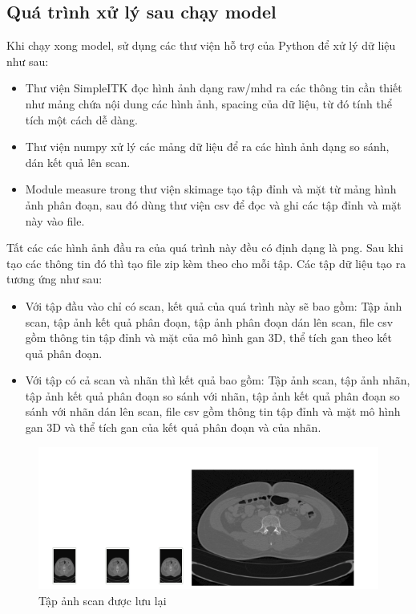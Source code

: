 \subsection{Quá trình xử lý sau chạy model}
Khi chạy xong model, sử dụng các thư viện hỗ trợ của Python để xử lý dữ liệu như sau:
\begin{itemize}
    \item Thư viện SimpleITK đọc hình ảnh dạng raw/mhd ra các thông tin cần thiết như mảng chứa nội dung các hình ảnh, spacing của dữ liệu, từ đó tính thể tích một cách dễ dàng.
    \item Thư viện numpy xử lý các mảng dữ liệu để ra các hình ảnh dạng so sánh, dán kết quả lên scan.
    \item Module measure trong thư viện skimage tạo tập đỉnh và mặt từ mảng hình ảnh phân đoạn, sau đó dùng thư viện csv để đọc và ghi các tập đỉnh và mặt này vào file.
\end{itemize}
Tất các các hình ảnh đầu ra của quá trình này đều có định dạng là png. Sau khi tạo các thông tin đó thì tạo file zip kèm theo cho mỗi tập. Các tập dữ liệu tạo ra tương ứng như sau:
\begin{itemize}
    \item Với tập đầu vào chỉ có scan, kết quả của quá trình này sẽ bao gồm: Tập ảnh scan, tập ảnh kết quả phân đoạn, tập ảnh phân đoạn dán lên scan, file csv gồm thông tin tập đỉnh và mặt của mô hình gan 3D, thể tích gan theo kết quả phân đoạn.
    \item Với tập có cả scan và nhãn thì kết quả bao gồm: Tập ảnh scan, tập ảnh nhãn, tập ảnh kết quả phân đoạn so sánh với nhãn,  tập ảnh kết quả phân đoạn so sánh với nhãn dán lên scan, file csv gồm thông tin tập đỉnh và mặt mô hình gan 3D và thể tích gan của kết quả phân đoạn và của nhãn.
\end{itemize}


\begin{figure}[h]
\centering
    \includegraphics[totalheight=7cm]{Images/app_listscan.png}
    \caption{Tập ảnh scan được lưu lại}
    \label{skip_conn}
\end{figure}


